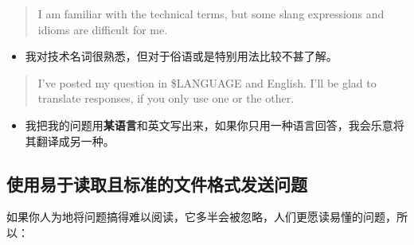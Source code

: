\documentclass[titlepage]{article}
\begin{document}
\begin{quote}
I am familiar with the technical terms, but some slang expressions and
idioms are difficult for me.
\end{quote}

\begin{itemize}

\item
  我对技术名词很熟悉，但对于俗语或是特别用法比较不甚了解。
\end{itemize}

\begin{quote}
I've posted my question in \$LANGUAGE and English. I'll be glad to
translate responses, if you only use one or the other.
\end{quote}

\begin{itemize}

\item
  我把我的问题用\textbf{某语言}和英文写出来，如果你只用一种语言回答，我会乐意将其翻译成另一种。
\end{itemize}

\hypertarget{ux4f7fux7528ux6613ux4e8eux8bfbux53d6ux4e14ux6807ux51c6ux7684ux6587ux4ef6ux683cux5f0fux53d1ux9001ux95eeux9898}{\subsection{使用易于读取且标准的文件格式发送问题}\label{ux4f7fux7528ux6613ux4e8eux8bfbux53d6ux4e14ux6807ux51c6ux7684ux6587ux4ef6ux683cux5f0fux53d1ux9001ux95eeux9898}}

如果你人为地将问题搞得难以阅读，它多半会被忽略，人们更愿读易懂的问题，所以：
\end{document}
